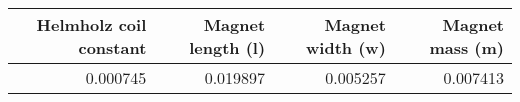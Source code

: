 \begin{table}[H]
\centering
\label{further_consts}
\begin{tabular}{rrrr}
\toprule
 Helmholz coil constant &  Magnet length (l) &  Magnet width (w) &  Magnet mass (m) \\
\midrule
               0.000745 &           0.019897 &          0.005257 &         0.007413 \\
\bottomrule
\end{tabular}
\end{table}
